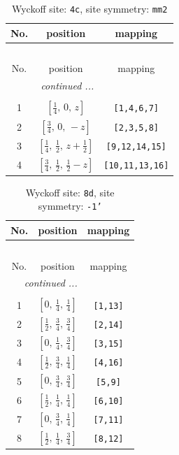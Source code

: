 \documentclass[fleqn,8pt]{jsarticle}
\begin{document}
\renewcommand{\arraystretch}{1.2}
\begin{longtable}{ccc}
\caption{Wyckoff site: {\tt 4c}, site symmetry: {\tt mm2}}
 \\
 \hline \hline
No. & position & mapping \\ \hline \endfirsthead

\multicolumn{2}{l}{\tablename\ \thetable{}} \\
 \hline \hline
No. & position & mapping \\ \hline \endhead

 \hline \hline
\multicolumn{2}{r}{\footnotesize\it continued ...} \\ \endfoot

 \hline \hline
\multicolumn{2}{r}{} \\ \endlastfoot

1 & $\left[ \frac{1}{4},\, 0,\, z \right]$ & {\tt [1,4,6,7]} \\ \hline
2 & $\left[ \frac{3}{4},\, 0,\, - z \right]$ & {\tt [2,3,5,8]} \\ \hline
3 & $\left[ \frac{1}{4},\, \frac{1}{2},\, z + \frac{1}{2} \right]$ & {\tt [9,12,14,15]} \\ \hline
4 & $\left[ \frac{3}{4},\, \frac{1}{2},\, \frac{1}{2} - z \right]$ & {\tt [10,11,13,16]} \\
\end{longtable}
\renewcommand{\arraystretch}{1.2}
\begin{longtable}{ccc}
\caption{Wyckoff site: {\tt 8d}, site symmetry: {\tt -1'}}
 \\
 \hline \hline
No. & position & mapping \\ \hline \endfirsthead

\multicolumn{2}{l}{\tablename\ \thetable{}} \\
 \hline \hline
No. & position & mapping \\ \hline \endhead

 \hline \hline
\multicolumn{2}{r}{\footnotesize\it continued ...} \\ \endfoot

 \hline \hline
\multicolumn{2}{r}{} \\ \endlastfoot

1 & $\left[ 0,\, \frac{1}{4},\, \frac{1}{4} \right]$ & {\tt [1,13]} \\ \hline
2 & $\left[ \frac{1}{2},\, \frac{3}{4},\, \frac{3}{4} \right]$ & {\tt [2,14]} \\ \hline
3 & $\left[ 0,\, \frac{1}{4},\, \frac{3}{4} \right]$ & {\tt [3,15]} \\ \hline
4 & $\left[ \frac{1}{2},\, \frac{3}{4},\, \frac{1}{4} \right]$ & {\tt [4,16]} \\ \hline
5 & $\left[ 0,\, \frac{3}{4},\, \frac{3}{4} \right]$ & {\tt [5,9]} \\ \hline
6 & $\left[ \frac{1}{2},\, \frac{1}{4},\, \frac{1}{4} \right]$ & {\tt [6,10]} \\ \hline
7 & $\left[ 0,\, \frac{3}{4},\, \frac{1}{4} \right]$ & {\tt [7,11]} \\ \hline
8 & $\left[ \frac{1}{2},\, \frac{1}{4},\, \frac{3}{4} \right]$ & {\tt [8,12]} \\
\end{longtable}
\end{document}
